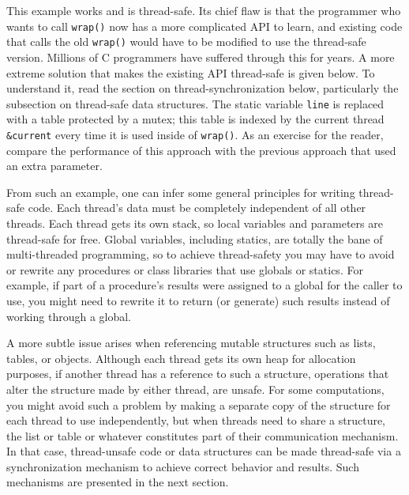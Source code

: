 This example works and is thread-safe. Its chief flaw is that the
programmer who wants to call \texttt{wrap()} now has a more
complicated API to learn, and existing code that calls the old
\texttt{wrap()} would have to be modified to use the thread-safe
version. Millions of C programmers have suffered through this for
years.  A more extreme solution that makes the existing API
thread-safe is given below. To understand it, read the section on
thread-synchronization below, particularly the subsection on
thread-safe data structures. The static variable \texttt{line}
is replaced with a table protected by a mutex; this table is indexed
by the current thread \texttt{\&current} every time it is used
inside of \texttt{wrap()}.  As an exercise for the reader,
compare the performance of this approach with the
previous approach that used an extra parameter.



From such an example, one can infer some general principles for
writing thread-safe code. Each thread's data must be completely
independent of all other threads.  Each thread gets its own stack, so
local variables and parameters are thread-safe for free.  Global
variables, including statics, are totally the bane of multi-threaded
programming, so to achieve thread-safety you may have to avoid or
rewrite any procedures or class libraries that use globals or statics.
For example, if part of a procedure's results were assigned to a
global for the caller to use, you might need to rewrite it to return
(or generate) such results instead of working through a global.

A more subtle issue arises when referencing mutable structures such
as lists, tables, or objects. Although each thread gets its own heap
for allocation purposes, if another thread has a reference to such
a structure, operations that alter the structure made by either
thread, are unsafe. For some computations, you might avoid such a
problem by making a separate copy of the structure for each thread
to use independently, but when threads need to share a structure, the
list or table or whatever constitutes part of their communication mechanism.
In that case, thread-unsafe code or data structures can be made thread-safe
via a synchronization mechanism to achieve correct behavior and results.
Such mechanisms are presented in the next section.



